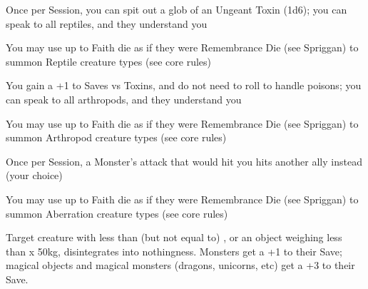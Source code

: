 {

Once per Session, you can spit out a glob of an Ungeant Toxin (1d6); you can speak to all reptiles, and they understand you


You may use up to \LVL Faith die as if they were Remembrance Die (see Spriggan) to summon Reptile creature types (see core rules)





\GOD[
Name=Mog,
Link=small-god-mog,
GodOf=Princess of Arachnids,
Holy=a gossamer veil
]


You gain a +1 to Saves vs Toxins, and do not need to roll to handle poisons; you can speak to all arthropods,  and they understand you


You may use up to \LVL  Faith die as if they were Remembrance Die (see Spriggan) to summon Arthropod creature types (see core rules)




\GOD[
Name=Ptah-Ungurath,
Link=small-god-ptah-ungurath,
GodOf=Archfiend of Monsters,
Holy=an amulet in the shape of an upside-down ankh
]


Once per Session, a Monster's attack that would hit you hits another ally instead (your choice)


You may use up to \LVL Faith die as if they were Remembrance Die (see Spriggan) to summon Aberration creature types (see core rules)

\LITURGY [
  Name= Gaze of the Void,
  Link= ptah-liturgy-gaze-of-the-void,
  Paradigm= Entropy ,
  Save=  Y (negates) ,
  Duration= 0 ,
  Counter=  n/a  ,
  Keywords= None ,
  Target=   Nearby or Far-Away Object or Creature
]



Target creature with less than (but not equal to) \DICE \HD, or an object weighing less than \DICE x 50kg, disintegrates into nothingness.  Monsters get a +1 to their Save; magical objects and magical monsters (dragons, unicorns, etc) get a +3 to their Save.

\LITURGY [
  Name= Millworks of Ptah,
  Link=ptah-liturgy-millworks-of-ptah,
  Paradigm= Entropy ,
  Save=  N ,
  Duration= 0 ,
  Counter=  n/a  ,
  Keywords= None ,
  Target=   Close (touch) tree
]



}
